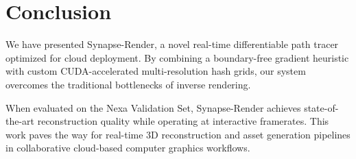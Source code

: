 \section{Conclusion}
We have presented Synapse-Render, a novel real-time differentiable path tracer optimized for cloud deployment. By combining a boundary-free gradient heuristic with custom CUDA-accelerated multi-resolution hash grids, our system overcomes the traditional bottlenecks of inverse rendering. 

When evaluated on the Nexa Validation Set, Synapse-Render achieves state-of-the-art reconstruction quality while operating at interactive framerates. This work paves the way for real-time 3D reconstruction and asset generation pipelines in collaborative cloud-based computer graphics workflows.
